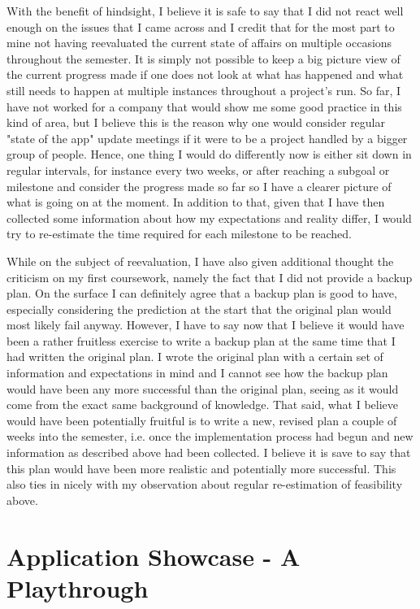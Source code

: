 \documentclass[11pt,a4paper,notitlepage]{article}
\begin{document}
    With the benefit of hindsight, I believe it is safe to say that I did not react well enough on the issues that I came across and I credit that for the most part to mine not having reevaluated the current state of affairs on multiple occasions throughout the semester. It is simply not possible to keep a big picture view of the current progress made if one does not look at what has happened and what still needs to happen at multiple instances throughout a project's run. So far, I have not worked for a company that would show me some good practice in this kind of area, but I believe this is the reason why one would consider regular "state of the app" update meetings if it were to be a project handled by a bigger group of people. Hence, one thing I would do differently now is either sit down in regular intervals, for instance every two weeks, or after reaching a subgoal or milestone and consider the progress made so far so I have a clearer picture of what is going on at the moment. In addition to that, given that I have then collected some information about how my expectations and reality differ, I would try to re-estimate the time required for each milestone to be reached.

    While on the subject of reevaluation, I have also given additional thought the criticism on my first coursework, namely the fact that I did not provide a backup plan. On the surface I can definitely agree that a backup plan is good to have, especially considering the prediction at the start that the original plan would most likely fail anyway. However, I have to say now that I believe it would have been a rather fruitless exercise to write a backup plan at the same time that I had written the original plan. I wrote the original plan with a certain set of information and expectations in mind and I cannot see how the backup plan would have been any more successful than the original plan, seeing as it would come from the exact same background of knowledge. That said, what I believe would have been potentially fruitful is to write a new, revised plan a couple of weeks into the semester, i.e. once the implementation process had begun and new information as described above had been collected. I believe it is save to say that this plan would have been more realistic and potentially more successful. This also ties in nicely with my observation about regular re-estimation of feasibility above.

\section{Application Showcase - A Playthrough}
\end{document}
